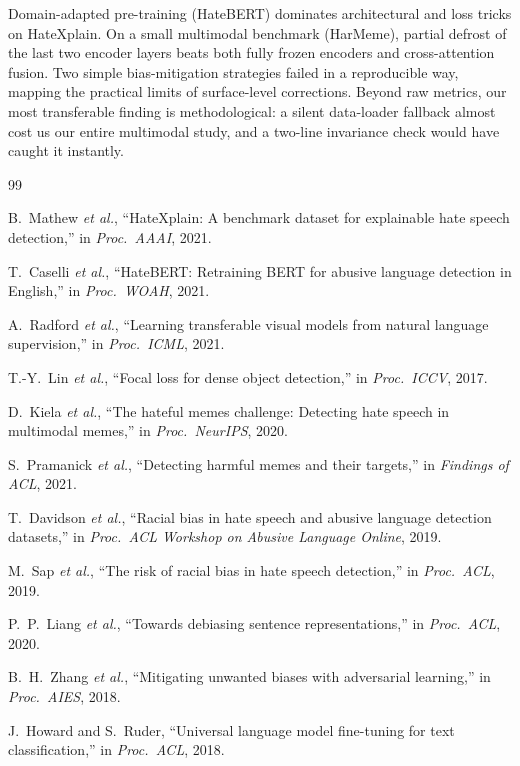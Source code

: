 \documentclass[10pt,a4paper,twocolumn]{article}
\begin{document}
Domain-adapted pre-training (HateBERT) dominates architectural and loss tricks on HateXplain. On a small multimodal benchmark (HarMeme), partial defrost of the last two encoder layers beats both fully frozen encoders and cross-attention fusion. Two simple bias-mitigation strategies failed in a reproducible way, mapping the practical limits of surface-level corrections. Beyond raw metrics, our most transferable finding is methodological: a silent data-loader fallback almost cost us our entire multimodal study, and a two-line invariance check would have caught it instantly.

\vspace{-0.3em}
\begin{thebibliography}{99}\small
\setlength{\itemsep}{0pt}\setlength{\parsep}{0pt}

 B.~Mathew \emph{et al.}, ``HateXplain: A benchmark dataset for explainable hate speech detection,'' in \emph{Proc.\ AAAI}, 2021.

 T.~Caselli \emph{et al.}, ``HateBERT: Retraining BERT for abusive language detection in English,'' in \emph{Proc.\ WOAH}, 2021.

 A.~Radford \emph{et al.}, ``Learning transferable visual models from natural language supervision,'' in \emph{Proc.\ ICML}, 2021.

 T.-Y.~Lin \emph{et al.}, ``Focal loss for dense object detection,'' in \emph{Proc.\ ICCV}, 2017.

 D.~Kiela \emph{et al.}, ``The hateful memes challenge: Detecting hate speech in multimodal memes,'' in \emph{Proc.\ NeurIPS}, 2020.

 S.~Pramanick \emph{et al.}, ``Detecting harmful memes and their targets,'' in \emph{Findings of ACL}, 2021.

 T.~Davidson \emph{et al.}, ``Racial bias in hate speech and abusive language detection datasets,'' in \emph{Proc.\ ACL Workshop on Abusive Language Online}, 2019.

 M.~Sap \emph{et al.}, ``The risk of racial bias in hate speech detection,'' in \emph{Proc.\ ACL}, 2019.

 P.~P.~Liang \emph{et al.}, ``Towards debiasing sentence representations,'' in \emph{Proc.\ ACL}, 2020.

 B.~H.~Zhang \emph{et al.}, ``Mitigating unwanted biases with adversarial learning,'' in \emph{Proc.\ AIES}, 2018.

 J.~Howard and S.~Ruder, ``Universal language model fine-tuning for text classification,'' in \emph{Proc.\ ACL}, 2018.

\end{thebibliography}
\end{document}
